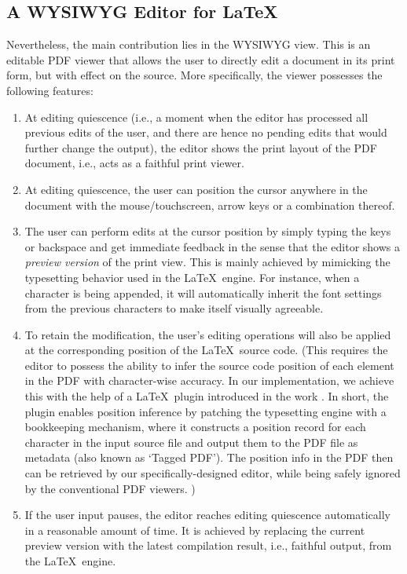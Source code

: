\documentclass[]{sigchi}
\begin{document}

\subsection{A WYSIWYG Editor for \LaTeX}
Nevertheless, the main contribution lies in the WYSIWYG view.
This is an editable PDF viewer that allows the user to directly edit a document in its print form, but with effect on the source. More specifically, the viewer possesses the following features:
\begin{enumerate}
\item At editing quiescence (i.e., a moment when the editor has processed all previous edits of the user, and there are hence no pending edits that would further change the output), the editor shows the print layout of the PDF document, i.e., acts as a faithful print viewer. 
\item At editing quiescence, the user can position the cursor anywhere in the document with the mouse/touchscreen, arrow keys or a combination thereof.
\item The user can perform edits at the cursor position by simply typing the keys or backspace and get immediate feedback in the sense that the editor shows a \textit{preview version} of the print view. This is mainly achieved by mimicking the typesetting behavior used in the \LaTeX\ engine. For instance, when a character is being appended, it will automatically inherit the font settings from the previous characters to make itself visually agreeable.
\item To retain the modification, the user's editing operations will also be applied at the corresponding position of the \LaTeX\ source code. (This requires the editor to possess the ability to infer the source code position of each element in the PDF with character-wise accuracy. 
In our implementation, we achieve this with the help of a \LaTeX\ plugin introduced in the work \cite{elliott2018}. In short, the plugin enables position inference by patching the typesetting engine with a bookkeeping mechanism, where it constructs a position record for each character in the input source file and output them to the PDF file as metadata (also known as `Tagged PDF'). The position info in the PDF then can be retrieved by our specifically-designed editor, while being safely ignored by the conventional PDF viewers. )
\item If the user input pauses, the editor reaches editing quiescence automatically in a reasonable amount of time. It is achieved by replacing the current preview version with the latest compilation result, i.e., faithful output, from the \LaTeX\ engine.
\end{enumerate}
\end{document}
